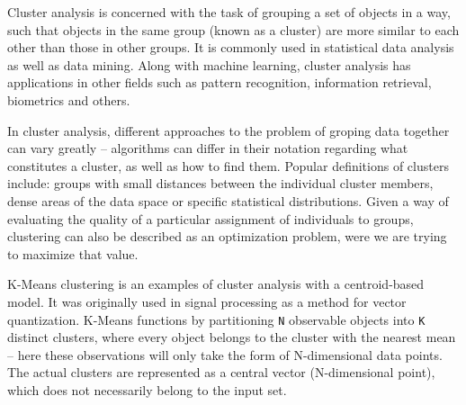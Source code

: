\documentclass{l4proj}
\begin{document}
Cluster analysis is concerned with the task of grouping a set of objects in a way, such that objects in the same group (known as a cluster) are more similar to each other than those in other groups\cite{MLIntro}. It is commonly used in statistical data analysis as well as data mining. Along with machine learning, cluster analysis has applications in other fields such as pattern recognition, information retrieval, biometrics and others.

In cluster analysis, different approaches to the problem of groping data together can vary greatly -- algorithms can differ in their notation regarding what constitutes a cluster, as well as how to find them. Popular definitions of clusters include: groups with small distances between the individual cluster members, dense areas of the data space or specific statistical distributions. Given a way of evaluating the quality of a particular assignment of individuals to groups, clustering can also be described as an optimization problem, were we are trying to maximize that value.

K-Means clustering is an examples of cluster analysis with a centroid-based model\cite{TopTen}. It was originally used in signal processing as a method for vector quantization. K-Means functions by partitioning \texttt{N} observable objects into \texttt{K} distinct clusters, where every object belongs to the cluster with the nearest mean  -- here these observations will only take the form of N-dimensional data points. The actual clusters are represented as a central vector (N-dimensional point), which does not necessarily belong to the input set.
\end{document}
